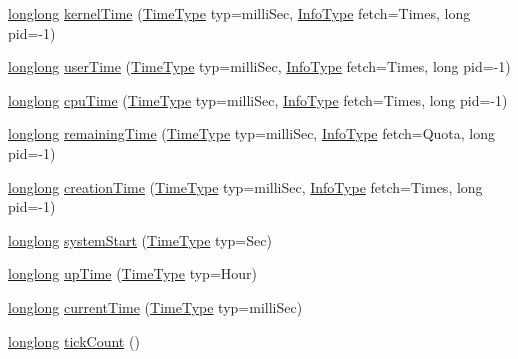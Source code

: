 \begin{DoxyCompactItemize}
$$\item 
\hyperlink{struct____longlong}{longlong} \hyperlink{namespaceSystem_a52400aecb0f63c891b51bc958ea064e9}{kernelTime} (\hyperlink{namespaceSystem_a15db094516c062b412df2453b4350f1a}{TimeType} typ=milliSec, \hyperlink{namespaceSystem_a71a46d52920ca8e98fc4649949be58a7}{InfoType} fetch=Times, long pid=-\/1)
\item 
\hyperlink{struct____longlong}{longlong} \hyperlink{namespaceSystem_a8a8a351f0cd9f68163ff6b520cde55c1}{userTime} (\hyperlink{namespaceSystem_a15db094516c062b412df2453b4350f1a}{TimeType} typ=milliSec, \hyperlink{namespaceSystem_a71a46d52920ca8e98fc4649949be58a7}{InfoType} fetch=Times, long pid=-\/1)
\item 
\hyperlink{struct____longlong}{longlong} \hyperlink{namespaceSystem_ada4da1a560bc9a436b2b04d3a15cd655}{cpuTime} (\hyperlink{namespaceSystem_a15db094516c062b412df2453b4350f1a}{TimeType} typ=milliSec, \hyperlink{namespaceSystem_a71a46d52920ca8e98fc4649949be58a7}{InfoType} fetch=Times, long pid=-\/1)
\item 
\hyperlink{struct____longlong}{longlong} \hyperlink{namespaceSystem_a5c0293a51a0a32d5ea7907b9749a977f}{remainingTime} (\hyperlink{namespaceSystem_a15db094516c062b412df2453b4350f1a}{TimeType} typ=milliSec, \hyperlink{namespaceSystem_a71a46d52920ca8e98fc4649949be58a7}{InfoType} fetch=Quota, long pid=-\/1)
\item 
\hyperlink{struct____longlong}{longlong} \hyperlink{namespaceSystem_a90888edb3659d54b56e8c9744357202e}{creationTime} (\hyperlink{namespaceSystem_a15db094516c062b412df2453b4350f1a}{TimeType} typ=milliSec, \hyperlink{namespaceSystem_a71a46d52920ca8e98fc4649949be58a7}{InfoType} fetch=Times, long pid=-\/1)
\item 
\hyperlink{struct____longlong}{longlong} \hyperlink{namespaceSystem_a1191eba9e2a1ac98985ec50e0820ab06}{systemStart} (\hyperlink{namespaceSystem_a15db094516c062b412df2453b4350f1a}{TimeType} typ=Sec)
\item 
\hyperlink{struct____longlong}{longlong} \hyperlink{namespaceSystem_a96965372858744c96c7cdf155693d8a0}{upTime} (\hyperlink{namespaceSystem_a15db094516c062b412df2453b4350f1a}{TimeType} typ=Hour)
\item 
\hyperlink{struct____longlong}{longlong} \hyperlink{namespaceSystem_ac41cf56db5c2f85828309490742a93d6}{currentTime} (\hyperlink{namespaceSystem_a15db094516c062b412df2453b4350f1a}{TimeType} typ=milliSec)
\item 
\hyperlink{struct____longlong}{longlong} \hyperlink{namespaceSystem_ad25a2f7dd8fd06ea18ea328a7bd26e79}{tickCount} ()
\end{DoxyCompactItemize}


